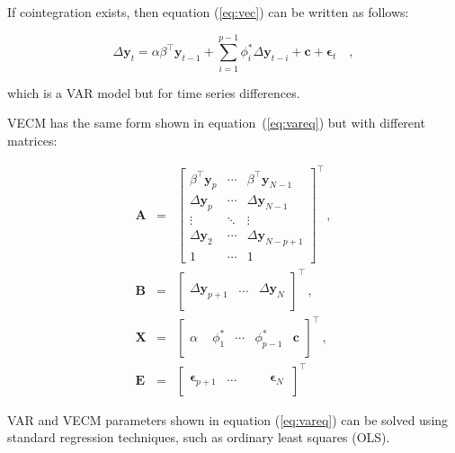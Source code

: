 If cointegration exists, then equation (\ref{eq:vec}) can be written as follows:


\begin{equation*}
 \label{eq:vecfull}
 \Delta \mathbf{y}_t = \alpha \beta^\top\mathbf{y}_{t-1} 
 + \sum_{i=1}^{p-1} \phi_i^*\Delta
\mathbf{y}_{t-i}  + \mathbf{c} + \mathbf{\epsilon}_t \quad ,
\end{equation*}

\noindent which is a VAR model but for time series differences.

VECM has the same form shown in equation~(\ref{eq:vareq}) but with
different matrices:

\begin{eqnarray}\label{eq:vecmatrix}
 \mathbf{A}&=&
   \begin{bmatrix} 
   \beta^\top \mathbf{y}_{p} & 
   \cdots & \beta^\top \mathbf{y}_{N-1} \\
   \Delta \mathbf{y}_p  & \cdots 
   &\Delta\mathbf{y}_{N-1} \\ 
   \vdots  & \ddots & \vdots \\
   \Delta\mathbf{y}_2  & \cdots 
   & \Delta \mathbf{y}_{N-p+1} \\
   1 & \cdots & 1 
   \end{bmatrix}^\top \label{eq:vecA} \, ,\\
\mathbf{B} & = &
 \begin{bmatrix}
 \quad\\
  \Delta \mathbf{y}_{p+1} & 
  \dots &
  \Delta \mathbf{y}_N \label{eq:vecB}\\
  \quad
 \end{bmatrix}^\top \, ,\\
\mathbf{X}&=&
  \begin{bmatrix}
   \quad \\
   \alpha & \phi_1^* & \cdots & \phi_{p-1}^* & \mathbf{c} \\  
   \quad
   \end{bmatrix}^\top \, ,\\
\mathbf{E} &=&
\begin{bmatrix}
   \quad \\
   \mathbf{\epsilon}_{p+1} &
   \dots &
   \quad &\mathbf{\epsilon}_N \, \\ \quad
\end{bmatrix}^\top 
\end{eqnarray}



VAR and VECM parameters shown in equation (\ref{eq:vareq}) can be solved
using standard regression techniques, such as ordinary least squares (OLS).


